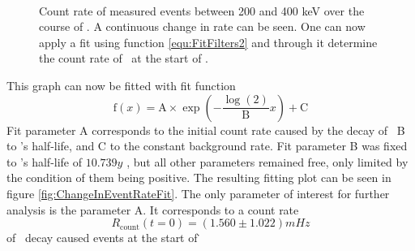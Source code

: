 \documentclass[encoding=utf8,british]{tumphthesis}
\begin{document}
\begin{figure}[t!]
\begin{minipage}[t]{.475\textwidth}
		\caption{
			Count rate of measured events between 200 and 400 keV over the course of \PII.
			A continuous change in rate can be seen. 
			One can now apply a fit using function \ref{equ:FitFilters2} and through it determine the count rate of \Kr\ at the start of \PII.
			}
		\label{fig:ChangeInEventRate}
	\end{minipage}
	\\
\end{figure}

This graph can now be fitted with fit function
\begin{equation}
\mathrm{f}(x) = \mathrm{A}\times\exp\left(-\frac{\log(2)}{\mathrm{B}} x \right) + \mathrm{C}
\label{equ:FitFilters2}
\end{equation}
Fit parameter A corresponds to the initial count rate caused by the decay of \Kr\, B to \Kr's half-life, and C to the constant background rate.
Fit parameter B was fixed to \Kr's half-life of \(10.739\unit{y}\) , but all other parameters remained free, only limited by the condition of them being positive.
The resulting fitting plot can be seen in figure  \ref{fig:ChangeInEventRateFit}.
The only parameter of interest for further analysis is the parameter \(\mathrm{A}\). 
It corresponds to a count rate  
\begin{equation*}
R_{\mathrm{count}}(t = 0) = (1.560\pm1.022) \unit{mHz}
\end{equation*}of \Kr\ decay caused events at the start of \PII\.

\end{document}
